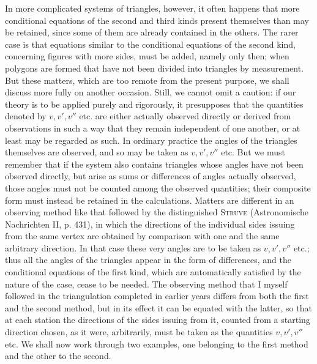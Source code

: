 In more complicated systems of triangles, however, it often happens that more conditional equations of the second and third kinds present themselves than may be retained, since some of them are already contained in the others. The rarer case is that equations similar to the conditional equations of the second kind, concerning figures with more sides, must be added, namely only then; when 
polygons are formed that have not been divided into triangles by measurement. But these matters, which are too remote from the present purpose, we shall discuss more fully on another occasion. Still, we cannot omit a caution: if our theory is to be applied purely and rigorously, it presupposes that the quantities denoted by \(v,v',v''\) etc. are either actually observed directly or derived from observations in such a way that they remain independent of one another, or at least may be regarded as such. In ordinary practice the angles of the triangles themselves are observed, and so may be taken as \(v,v',v''\) etc. But we must remember that if the system also contains triangles whose angles have not been observed directly, but arise as sums or differences of angles actually observed, those angles must not be counted among the observed quantities; their composite form must instead be retained in the calculations. Matters are different in an observing method like that followed by the distinguished \textsc{Struve} (Astronomische Nachrichten II, p. 431), in which the directions of the individual sides issuing from the same vertex are obtained by comparison with one and the same arbitrary direction. In that case these very angles are to be taken as \(v,v',v''\) etc.; thus all the angles of the triangles appear in the form of differences, and the conditional equations of the first kind, which are automatically satisfied by the nature of the case, cease to be needed. The observing method that I myself followed in the triangulation completed in earlier years differs from both the first and the second method, but in its effect it can be equated with the latter, so that at each station the directions of the sides issuing from it, counted from a starting direction chosen, as it were, arbitrarily, must be taken as the quantities \(v,v',v''\) etc. We shall now work through two examples, one belonging to the first method and the other to the second.
